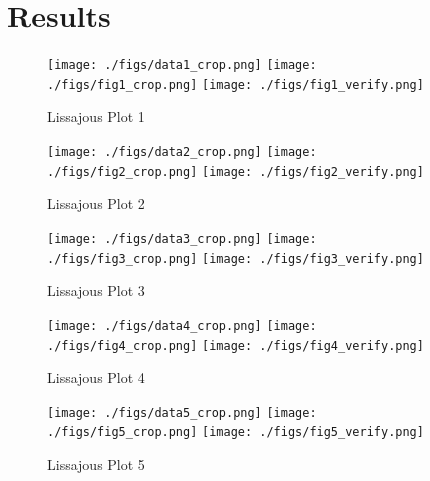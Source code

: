 \documentclass[12pt]{article}
\begin{document}
\section{Results}
\begin{figure*}[ht!]
    {\texttt{[image: ./figs/data1\_crop.png]}}
    \hspace{\fill}
    {\texttt{[image: ./figs/fig1\_crop.png]}}
    \hspace{\fill}
    {\texttt{[image: ./figs/fig1\_verify.png]}}\\
    \caption{Lissajous Plot 1}
\end{figure*}
\begin{figure*}[ht!]
    {\texttt{[image: ./figs/data2\_crop.png]}}
    \hspace{\fill}
    {\texttt{[image: ./figs/fig2\_crop.png]}}
    \hspace{\fill}
    {\texttt{[image: ./figs/fig2\_verify.png]}}\\
    \caption{Lissajous Plot 2}
\end{figure*}
\begin{figure*}[ht!]
    {\texttt{[image: ./figs/data3\_crop.png]}}
    \hspace{\fill}
    {\texttt{[image: ./figs/fig3\_crop.png]}}
    \hspace{\fill}
    {\texttt{[image: ./figs/fig3\_verify.png]}}\\
    \caption{Lissajous Plot 3}
\end{figure*}
\begin{figure*}[ht!]
    {\texttt{[image: ./figs/data4\_crop.png]}}
    \hspace{\fill}
    {\texttt{[image: ./figs/fig4\_crop.png]}}
    \hspace{\fill}
    {\texttt{[image: ./figs/fig4\_verify.png]}}\\
    \caption{Lissajous Plot 4}
\end{figure*}
\begin{figure*}[ht!]
    {\texttt{[image: ./figs/data5\_crop.png]}}
    \hspace{\fill}
    {\texttt{[image: ./figs/fig5\_crop.png]}}
    \hspace{\fill}
    {\texttt{[image: ./figs/fig5\_verify.png]}}\\
    \caption{Lissajous Plot 5}
\end{figure*}
\end{document}
